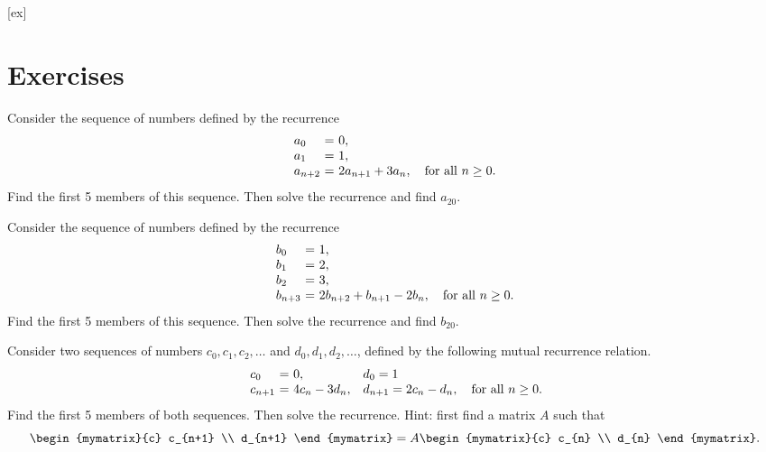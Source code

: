 [ex]
\section*{Exercises}


\begin{ex}
  Consider the sequence of numbers defined by the recurrence
  \begin{equation*}
    \begin{array}{l@{~}c@{~}l}
      a_0 &=& 0, \\
      a_1 &=& 1, \\
      a_{n+2} &=& 2a_{n+1} + 3a_{n}, \quad\mbox{for all $n\geq 0$.}\\
    \end{array}
  \end{equation*}
  Find the first 5 members of this sequence. Then solve the recurrence
  and find $a_{20}$.
\end{ex}
  
\begin{ex}
  Consider the sequence of numbers defined by the recurrence
  \begin{equation*}
    \begin{array}{l@{~}c@{~}l}
      b_0 &=& 1, \\
      b_1 &=& 2, \\
      b_2 &=& 3, \\
      b_{n+3} &=& 2b_{n+2} + b_{n+1} - 2b_{n}, \quad\mbox{for all $n\geq 0$.}\\
    \end{array}
  \end{equation*}
  Find the first 5 members of this sequence. Then solve the recurrence
  and find $b_{20}$.
\end{ex}

\begin{ex}
  Consider two sequences of numbers $c_0,c_1,c_2,\ldots$ and
  $d_0,d_1,d_2,\ldots$, defined by the following mutual recurrence
  relation.
  \begin{equation*}
    \begin{array}{l@{~}c@{~}l@{\quad}l@{~}c@{~}l}
      c_0 &=& 0,             & d_0 = 1 \\
      c_{n+1} &=& 4c_n - 3d_n, & d_{n+1} = 2c_n - d_n, \quad\mbox{for all $n\geq 0$.}\\
    \end{array}
  \end{equation*}
  Find the first 5 members of both sequences. Then solve the
  recurrence. Hint: first find a matrix $A$ such that
  \begin{equation*}
    \begin{mymatrix}{c} c_{n+1} \\ d_{n+1} \end{mymatrix}
    = A \begin{mymatrix}{c} c_{n} \\ d_{n} \end{mymatrix}.
  \end{equation*}
\end{ex}  
  
